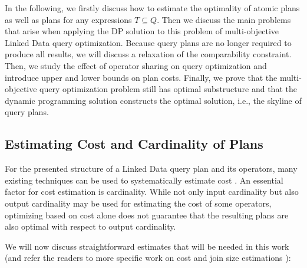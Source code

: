 In the following, we firstly discuss how to estimate the optimality of atomic plans as well as plans for any expressions $T \subseteq Q$. Then we discuss the main problems that arise when applying the DP solution to this problem of multi-objective Linked Data query optimization.  Because query plans are no longer required to produce all results, we will
discuss a relaxation of the comparability constraint. Then, we study the effect of operator sharing on query optimization and introduce upper and lower bounds on plan
costs. Finally, we prove that the multi-objective query optimization problem still has optimal
substructure and that the dynamic programming solution constructs the
optimal solution, i.e., the skyline of query plans.

\subsection{Estimating Cost and Cardinality of Plans}
\label{sec:estimation}
For the presented structure of a Linked Data query plan and its operators, many existing techniques can be used to systematically estimate cost . An essential factor for cost estimation is cardinality. While not only input cardinality but also output cardinality may be used for estimating the cost of some operators, optimizing based on cost alone does not guarantee that the resulting plans are also optimal with respect to output cardinality. 

We will now discuss straightforward estimates that will be needed in this work (and refer the readers to more specific work on cost and join size estimations ):


